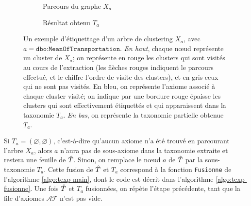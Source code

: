 \begin{figure}
    \centering
    \begin{subfigure}{\textwidth}
        \centering
        
        \caption{Parcours du graphe $X_a$}
        \label{subfig:texp-sbs1}
    \end{subfigure}
    \begin{subfigure}{\textwidth}
        \centering
        
        \caption{Résultat obtenu $T_a$}
        \label{subfig:texp-sbs2}
    \end{subfigure}
    \caption[Parcours et étiquettage d'un arbre de clustering]{Un exemple d'étiquettage d'un arbre de clustering $X_a$, avec $a = \texttt{dbo:MeanOfTransportation}$. \textit{En haut}, chaque nœud représente un cluster de $X_a$; on représente en rouge les clusters qui sont visités au cours de l'extraction (les flèches rouges indiquent le parcours effectué, et le chiffre l'ordre de visite des clusters), et en gris ceux qui ne sont pas visités. En bleu, on représente l'axiome associé à chaque cluster visité; on indique par une bordure rouge épaisse les clusters qui sont effectivement étiquettés et qui apparaissent dans la taxonomie $T_a$. \textit{En bas}, on représente la taxonomie partielle obtenue $T_a$.}
    \label{fig:texp-stebbstep}
\end{figure}

%    


Si $T_a = (\varnothing, \varnothing)$, c'est-à-dire qu'aucun axiome n'a été trouvé en parcourant l'arbre $X_a$, alors $a$ n'aura pas de sous-axiome dans la taxonomie extraite et restera une feuille de $\hat{T}$. Sinon, on remplace le nœud $a$ de $\hat{T}$ par la sous-taxonomie $T_a$. Cette fusion de $\hat{T}$ et $T_a$ correspond à la fonction \texttt{Fusionne} de l'algorithme \ref{algo:texp-main}, dont le code est décrit dans l'algorithme \ref{algo:texp-fusionne}. Une fois $\hat{T}$ et $T_a$ fusionnées, on répète l'étape précédente, tant que la file d'axiomes $\mathcal{AT}$ n'est pas vide.

